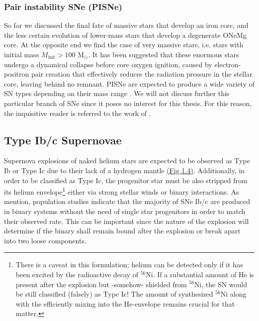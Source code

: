 \documentclass[../../main/thesis_msc.tex]{subfiles}
\begin{document}
				\subsubsection{Pair instability SNe (PISNe)}
				
					So far we discussed the final fate of massive stars that develop an iron core, and the less certain evolution of lower-mass stars that develop a degenerate ONeMg core. At the opposite end we find the case of very massive stars, i.e. stars with initial mass $M_{\text{init}} > 100$ M$_{\odot}$. It has been suggested \citep{langer12} that these enormous stars undergo a dynamical collapse before core oxygen ignition, caused by electron-positron pair creation that effectively reduces the radiation pressure in the stellar core, leaving behind no remnant. PISNe are expected to produce a wide variety of SN types depending on their mass range \citep{Gilmer2017}. We will not discuss further this particular branch of SNe since it poses no interest for this thesis. For this reason, the inquisitive reader is referred to the work of \cite{Langer_PISNe, Woosley_PISNe, Kozyreva2017, Gilmer2017}.
					
				
				
			\subsection{Type Ib/c Supernovae}
			
				Supernova explosions of naked helium stars are expected to be observed as Type Ib or Type Ic due to their lack of a hydrogen mantle \hyperref[fig:SNe_classification]{(Fig 1.4)}. Additionally, in order to be classified as Type Ic, the progenitor star must be also stripped from its helium envelope\footnote{There is a caveat in this formulation; helium can be detected only if it has been excited by the radioactive decay of $^{56}$Ni. If a substantial amount of He is present after the explosion but -somehow- shielded from $^{56}$Ni, the SN would be still classified (falsely) as Type Ic! The amount of synthesized $^{56}$Ni along with the efficiently mixing into the He-envelope remains crucial for that matter.} either via strong stellar winds or binary interactions. As \cite{Yoon2010} mention, population studies indicate that the majority of SNe Ib/c are produced in binary systems without the need of single star progenitors in order to match their observed rate. This can be important since the nature of the explosion will determine if the binary shall remain bound after the explosion or break apart into two loose components.
				
\end{document}
